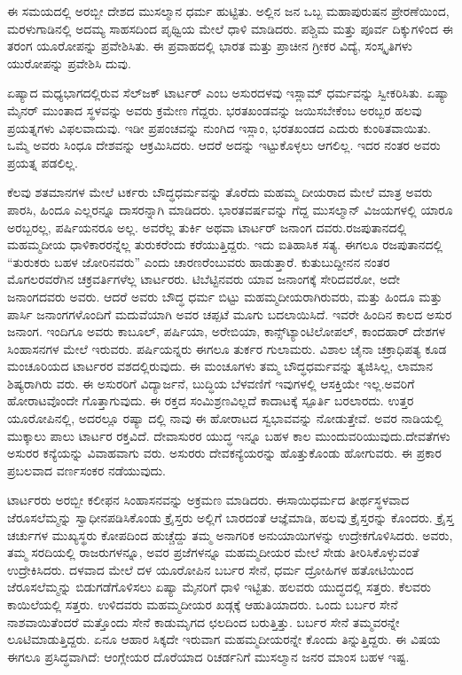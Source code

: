 ಈ ಸಮಯದಲ್ಲಿ ಅರಬ್ಬೀ ದೇಶದ ಮುಸಲ್ಮಾನ ಧರ್ಮ ಹುಟ್ಟಿತು. ಅಲ್ಲಿನ ಜನ ಒಬ್ಬ ಮಹಾಪುರುಷನ ಪ್ರೇರಣೆಯಿಂದ, ಮರಳುಗಾಡಿನಲ್ಲಿ ಅದಮ್ಯ ಸಾಹಸದಿಂದ ಪೃಥ್ವಿಯ ಮೇಲೆ ಧಾಳಿ ಮಾಡಿದರು. ಪಶ್ಚಿಮ ಮತ್ತು ಪೂರ್ವ ದಿಕ್ಕುಗಳಿಂದ ಈ ತರಂಗ ಯೂರೋಪನ್ನು ಪ್ರವೇಶಿಸಿತು. ಈ ಪ್ರವಾಹದಲ್ಲಿ ಭಾರತ ಮತ್ತು ಪ್ರಾಚೀನ ಗ್ರೀಕರ ವಿದ್ಯೆ, ಸಂಸ್ಕೃತಿಗಳು ಯುರೋಪನ್ನು ಪ್ರವೇಶಿಸಿ ದುವು.

ಏಷ್ಯಾದ ಮಧ್ಯಭಾಗದಲ್ಲಿರುವ ಸೆಲ್​ಜಕ್​ ಟಾರ್ಟರ್​ ಎಂಬ ಅಸುರದಳವು ಇಸ್ಲಾಮ್​ ಧರ್ಮವನ್ನು ಸ್ವೀಕರಿಸಿತು. ಏಷ್ಯಾ ಮೈನರ್​ ಮುಂತಾದ ಸ್ಥಳವನ್ನು ಅವರು ಕ್ರಮೇಣ ಗೆದ್ದರು. ಭರತಖಂಡವನ್ನು ಜಯಿಸಬೇಕೆಂಬ ಅರಬ್ಬರ ಹಲವು ಪ್ರಯತ್ನಗಳು ವಿಫಲವಾದುವು. ಇಡೀ ಪ್ರಪಂಚವನ್ನು ನುಂಗಿದ ಇಸ್ಲಾಂ, ಭರತಖಂಡದ ಎದುರು ಕುಂಠಿತವಾಯಿತು. ಒಮ್ಮೆ ಅವರು ಸಿಂಧೂ ದೇಶವನ್ನು ಆಕ್ರಮಿಸಿದರು. ಆದರೆ ಅದನ್ನು ಇಟ್ಟುಕೊಳ್ಳಲು ಆಗಲಿಲ್ಲ. ಇದರ ನಂತರ ಅವರು ಪ್ರಯತ್ನ ಪಡಲಿಲ್ಲ.

ಕೆಲವು ಶತಮಾನಗಳ ಮೇಲೆ ಟರ್ಕರು ಬೌದ್ಧಧರ್ಮವನ್ನು ತೊರೆದು ಮಹಮ್ಮ ದೀಯರಾದ ಮೇಲೆ ಮಾತ್ರ ಅವರು ಪಾರಸಿ, ಹಿಂದೂ ಎಲ್ಲರನ್ನೂ ದಾಸರನ್ನಾಗಿ ಮಾಡಿದರು. ಭಾರತವರ್ಷವನ್ನು ಗೆದ್ದ ಮುಸಲ್ಮಾನ್​ ವಿಜಯಗಳಲ್ಲಿ ಯಾರೂ ಅರಬ್ಬರಲ್ಲ, ಪರ್ಷಿಯನರೂ ಅಲ್ಲ. ಅವರೆಲ್ಲ ತುರ್ಕಿ ಅಥವಾ ಟಾರ್ಟರ್​ ಜನಾಂಗ ದವರು.ರಜಪುತಾನದಲ್ಲಿ ಮಹಮ್ಮದೀಯ ಧಾಳಿಕಾರರನ್ನೆಲ್ಲ ತುರುಕರೆಂದು ಕರೆಯುತ್ತಿದ್ದರು. ಇದು ಐತಿಹಾಸಿಕ ಸತ್ಯ. ಈಗಲೂ ರಜಪುತಾನದಲ್ಲಿ “ತುರುಕರು ಬಹಳ ಜೋರಿನವರು” ಎಂದು ಚಾರಣರೆಂಬುವರು ಹಾಡುತ್ತಾರೆ. ಕುತುಬುದ್ದೀನನ ನಂತರ ಮೊಗಲರವರೆಗಿನ ಚಕ್ರವರ್ತಿಗಳೆಲ್ಲ ಟಾರ್ಟರರು. ಟಿಬೆಟ್ಟಿನವರು ಯಾವ ಜನಾಂಗಕ್ಕೆ ಸೇರಿದವರೋ, ಅದೇ ಜನಾಂಗದವರು ಅವರು. ಆದರೆ ಅವರು ಬೌದ್ಧ ಧರ್ಮ ಬಿಟ್ಟು ಮಹಮ್ಮದೀಯರಾಗಿರುವರು, ಮತ್ತು ಹಿಂದೂ ಮತ್ತು ಪಾರ್ಸಿ ಜನಾಂಗಗಳೊಂದಿಗೆ ಮದುವೆಯಾಗಿ ಅವರ ಚಪ್ಪಟೆ ಮೂಗು ಬದಲಾಯಿಸಿದೆ. ಇವರೇ ಹಿಂದಿನ ಕಾಲದ ಅಸುರ ಜನಾಂಗ. ಇಂದಿಗೂ ಅವರು ಕಾಬೂಲ್​, ಪರ್ಷಿಯಾ, ಅರೇಬಿಯಾ, ಕಾನ್ಸ್​ಟ್ಯಾಂಟಿಲೋಪಲ್​, ಕಾಂದಹಾರ್​ ದೇಶಗಳ ಸಿಂಹಾಸನಗಳ ಮೇಲೆ ಇರುವರು. ಪರ್ಷಿಯನ್ನರು ಈಗಲೂ ತುರ್ಕರ ಗುಲಾಮರು. ವಿಶಾಲ ಚೈನಾ ಚಕ್ರಾಧಿಪತ್ಯ ಕೂಡ ಮಂಚೂರಿಯದ ಟಾರ್ಟರರ ವಶದಲ್ಲಿರುವುದು. ಈ ಮಂಚೂಗಳು ತಮ್ಮ ಬೌದ್ಧಧರ್ಮವನ್ನು ತ್ಯಜಿಸಿಲ್ಲ, ಲಾಮಾನ ಶಿಷ್ಯರಾಗಿರು ವರು. ಈ ಅಸುರರಿಗೆ ವಿದ್ಯಾರ್ಜನೆ, ಬುದ್ಧಿಯ ಬೆಳವಣಿಗೆ ಇವುಗಳಲ್ಲಿ ಆಸಕ್ತಿಯೇ ಇಲ್ಲ.ಅವರಿಗೆ ಹೋರಾಟವೊಂದೇ ಗೊತ್ತಾಗುವುದು. ಈ ರಕ್ತದ ಸಂಮಿಶ್ರಣವಿಲ್ಲದೆ ಕಾದಾಟಕ್ಕೆ ಸ್ಪೂರ್ತಿ ಬರಲಾರದು. ಉತ್ತರ ಯೂರೋಪಿನಲ್ಲಿ, ಅದರಲ್ಲೂ ರಷ್ಯಾ ದಲ್ಲಿ ನಾವು ಈ ಹೋರಾಟದ ಸ್ವಭಾವವನ್ನು ನೋಡುತ್ತೇವೆ. ಅವರ ನಾಡಿಯಲ್ಲಿ ಮುಕ್ಕಾಲು ಪಾಲು ಟಾರ್ಟರ ರಕ್ತವಿದೆ. ದೇವಾಸುರರ ಯುದ್ಧ ಇನ್ನೂ ಬಹಳ ಕಾಲ ಮುಂದುವರಿಯುವುದು.ದೇವತೆಗಳು ಅಸುರರ ಕನ್ಯೆಯನ್ನು ವಿವಾಹವಾಗು ವರು. ಅಸುರರು ದೇವಕನ್ಯೆಯರನ್ನು ಹೊತ್ತುಕೊಂಡು ಹೋಗುವರು. ಈ ಪ್ರಕಾರ ಪ್ರಬಲವಾದ ವರ್ಣಸಂಕರ ನಡೆಯುವುದು.

ಟಾರ್ಟರರು ಅರಬ್ಬೀ ಕಲೀಫನ ಸಿಂಹಾಸನವನ್ನು ಅಕ್ರಮಣ ಮಾಡಿದರು. ಈಸಾಯಿಧರ್ಮದ ತೀರ್ಥಸ್ಥಳವಾದ ಜೆರೂಸಲೆಮ್ಮನ್ನು ಸ್ವಾಧೀನಪಡಿಸಿಕೊಂಡು ಕ್ರೈಸ್ತರು ಅಲ್ಲಿಗೆ ಬಾರದಂತೆ ಆಜ್ಞೆಮಾಡಿ, ಹಲವು ಕ್ರೈಸ್ತರನ್ನು ಕೊಂದರು. ಕ್ರೈಸ್ತ ಚರ್ಚುಗಳ ಮುಖ್ಯಸ್ಥರು ಕೋಪದಿಂದ ಹುಚ್ಚೆದ್ದು ತಮ್ಮ ಅನಾಗರಿಕ ಅನುಯಾಯಿಗಳನ್ನು ಉದ್ರೇಕಗೊಳಿಸಿದರು. ಅವರು, ತಮ್ಮ ಸರದಿಯಲ್ಲಿ ರಾಜರುಗಳನ್ನೂ, ಅವರ ಪ್ರಜೆಗಳನ್ನೂ ಮಹಮ್ಮದೀಯರ ಮೇಲೆ ಸೇಡು ತೀರಿಸಿಕೊಳ್ಳುವಂತೆ ಉದ್ರೇಕಿಸಿದರು. ದಳವಾದ ಮೇಲೆ ದಳ ಯೂರೋಪಿನ ಬರ್ಬರ ಸೇನೆ, ಧರ್ಮ ದ್ರೋಹಿಗಳ ಹತೋಟಿಯಿಂದ ಜೆರೂಸಲೆಮ್ಮನ್ನು ಬಿಡುಗಡೆಗೊಳಿಸಲು ಏಷ್ಯಾ ಮೈನರಿಗೆ ಧಾಳಿ ಇಟ್ಟಿತು. ಹಲವರು ಯುದ್ಧದಲ್ಲಿ ಸತ್ತರು. ಕೆಲವರು ಕಾಯಿಲೆಯಲ್ಲಿ ಸತ್ತರು. ಉಳಿದವರು ಮಹಮ್ಮದೀಯರ ಖಡ್ಗಕ್ಕೆ ಆಹುತಿಯಾದರು. ಒಂದು ಬರ್ಬರ ಸೇನೆ ನಾಶವಾಯಿತೆಂದರೆ ಮತ್ತೊಂದು ಸೇನೆ ಕಾಡುಮೃಗದ ಛಲದಿಂದ ಬರುತ್ತಿತ್ತು. ಬರ್ಬರ ಸೇನೆ ತಮ್ಮವರನ್ನೇ ಲೂಟಿಮಾಡುತ್ತಿದ್ದರು. ಏನೂ ಆಹಾರ ಸಿಕ್ಕದೇ ಇರುವಾಗ ಮಹಮ್ಮದೀಯರನ್ನೇ ಕೊಂದು ತಿನ್ನುತ್ತಿದ್ದರು. ಈ ವಿಷಯ ಈಗಲೂ ಪ್ರಸಿದ್ಧವಾಗಿದೆ: ಆಂಗ್ಲೇಯರ ದೊರೆಯಾದ ರಿಚರ್ಡನಿಗೆ ಮುಸಲ್ಮಾನ ಜನರ ಮಾಂಸ ಬಹಳ ಇಷ್ಟ.

